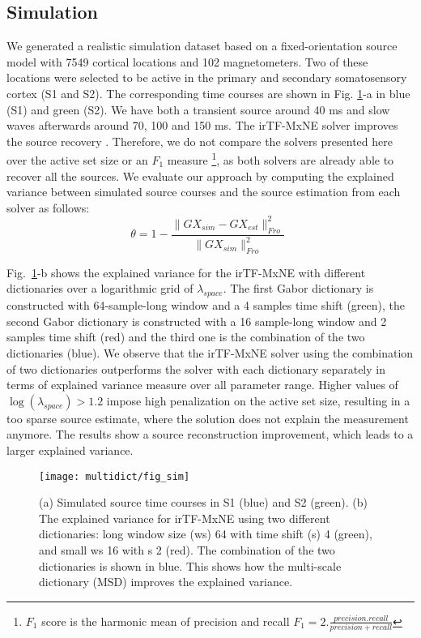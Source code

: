 \subsection{Simulation}
We generated a realistic simulation dataset based on a fixed-orientation source model with 7549 cortical locations and 102 magnetometers. Two of these locations were selected to be active in the primary and secondary somatosensory cortex (S1 and S2). The corresponding time courses are shown in Fig. \ref{fig:simulation}-a in blue (S1) and green (S2). We have both a transient source around 40 ms and slow waves afterwards around 70, 100 and 150 ms. The irTF-MxNE solver improves the source recovery \cite{daniel15}. Therefore, we do not compare the solvers presented here over the active set size or an $F_1$ measure \footnote{$F_1$ score is the harmonic mean of precision and recall $F_1=2.\frac{precision . recall}{precision + recall}$}, %
as both solvers are already able to recover all the sources. %
We evaluate our approach by computing  %
the explained variance between simulated source courses and the source estimation from each solver as follows:
\begin{equation}
	\theta = 1 - \frac{\|GX_{sim}-GX_{est}\|^2_{Fro}}{\|GX_{sim}\|^2_{Fro}} \enspace
\end{equation}

Fig.~\ref{fig:simulation}-b shows the explained variance for the irTF-MxNE with different dictionaries over a logarithmic grid of $\lambda_{space}$. The first Gabor dictionary is constructed with 64-sample-long window and a 4 samples time shift (green), the second Gabor dictionary is constructed with a 16 sample-long window and 2 samples time shift (red) and the third one is the combination of the two dictionaries (blue). We observe that the irTF-MxNE solver using the combination of two dictionaries outperforms the solver with each dictionary separately in terms of explained variance measure over all parameter range. Higher values of $\log(\lambda_{space})>1.2$ impose high penalization on the active set size, resulting in a too sparse source estimate, where the solution does not explain the measurement anymore. The results show a source reconstruction improvement, which leads to a larger explained variance.

\begin{figure}
\centering
	\texttt{[image: multidict/fig\_sim]}
    \caption{(a) Simulated source time courses in S1 (blue) and S2 (green). (b) The explained variance for irTF-MxNE using two different dictionaries: long window size (ws) 64 with time shift (s) 4 (green), and small ws 16 with s 2 (red). The combination of the two dictionaries is shown in blue. This shows how the multi-scale dictionary (MSD) improves the explained variance.}
    \label{fig:simulation}
\end{figure}

